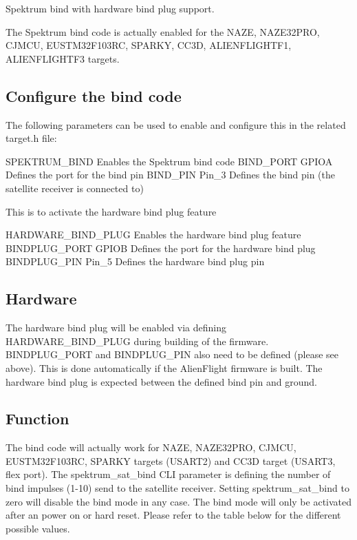 Spektrum bind with hardware bind plug support.

The Spektrum bind code is actually enabled for the N\+A\+Z\+E, N\+A\+Z\+E32\+P\+R\+O, C\+J\+M\+C\+U, E\+U\+S\+T\+M32\+F103\+R\+C, S\+P\+A\+R\+K\+Y, C\+C3\+D, A\+L\+I\+E\+N\+F\+L\+I\+G\+H\+T\+F1, A\+L\+I\+E\+N\+F\+L\+I\+G\+H\+T\+F3 targets.

\subsection*{Configure the bind code}

The following parameters can be used to enable and configure this in the related target.\+h file\+: \begin{DoxyVerb}SPEKTRUM_BIND          Enables the Spektrum bind code
BIND_PORT  GPIOA       Defines the port for the bind pin
BIND_PIN   Pin_3       Defines the bind pin (the satellite receiver is connected to)
\end{DoxyVerb}


This is to activate the hardware bind plug feature \begin{DoxyVerb}HARDWARE_BIND_PLUG     Enables the hardware bind plug feature
BINDPLUG_PORT  GPIOB   Defines the port for the hardware bind plug
BINDPLUG_PIN   Pin_5   Defines the hardware bind plug pin
\end{DoxyVerb}


\subsection*{Hardware}

The hardware bind plug will be enabled via defining H\+A\+R\+D\+W\+A\+R\+E\+\_\+\+B\+I\+N\+D\+\_\+\+P\+L\+U\+G during building of the firmware. B\+I\+N\+D\+P\+L\+U\+G\+\_\+\+P\+O\+R\+T and B\+I\+N\+D\+P\+L\+U\+G\+\_\+\+P\+I\+N also need to be defined (please see above). This is done automatically if the Alien\+Flight firmware is built. The hardware bind plug is expected between the defined bind pin and ground.

\subsection*{Function}

The bind code will actually work for N\+A\+Z\+E, N\+A\+Z\+E32\+P\+R\+O, C\+J\+M\+C\+U, E\+U\+S\+T\+M32\+F103\+R\+C, S\+P\+A\+R\+K\+Y targets (U\+S\+A\+R\+T2) and C\+C3\+D target (U\+S\+A\+R\+T3, flex port). The spektrum\+\_\+sat\+\_\+bind C\+L\+I parameter is defining the number of bind impulses (1-\/10) send to the satellite receiver. Setting spektrum\+\_\+sat\+\_\+bind to zero will disable the bind mode in any case. The bind mode will only be activated after an power on or hard reset. Please refer to the table below for the different possible values.

